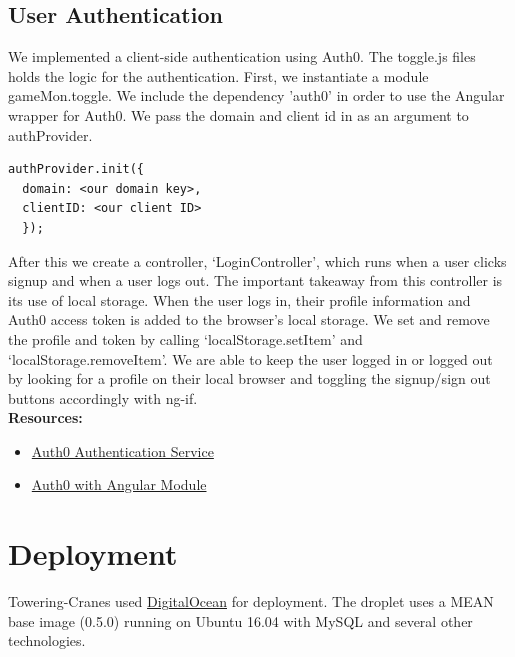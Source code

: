\documentclass{article}
\begin{document}
\subsection{User Authentication}
We implemented a client-side authentication using Auth0. The toggle.js files holds the logic for the authentication. First, we instantiate a module gameMon.toggle. We include the dependency 'auth0' in order to use the Angular wrapper for Auth0. We pass the domain and client id in as an argument to authProvider.
\begin{lstlisting}
authProvider.init({
  domain: <our domain key>,
  clientID: <our client ID>
  });
\end{lstlisting}
After this we create a controller, ‘LoginController’, which runs when a user clicks signup and when a user logs out.  The important takeaway from this controller is its use of local storage.  When the user logs in, their profile information and Auth0 access token is added to the browser’s local storage.  We set and remove the profile and token by calling ‘localStorage.setItem’ and ‘localStorage.removeItem’. We are able to keep the user logged in or logged out by looking for a profile on their local browser and toggling the signup/sign out buttons accordingly with ng-if.
\\
\textbf{Resources:}
\begin{itemize}
  \item \href {https://auth0.com/docs/quickstart/spa/angularjs/00-intro}{Auth0 Authentication Service}
  \item \href {https://github.com/auth0/auth0-angular}{Auth0 with Angular Module}
\end{itemize}

\section{Deployment}
Towering-Cranes used \href{http://www.digitalocean.com/}{DigitalOcean} for deployment. The droplet uses a MEAN base image (0.5.0) running on Ubuntu 16.04 with MySQL and several other technologies.
\end{document}

